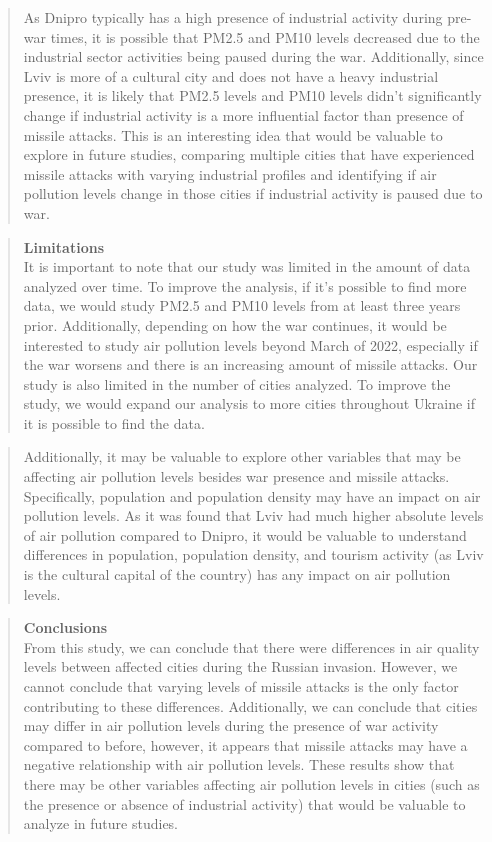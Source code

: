 \documentclass[
  12pt,
]{article}
\begin{document}
\begin{quote}
As Dnipro typically has a high presence of industrial activity during
pre-war times, it is possible that PM2.5 and PM10 levels decreased due
to the industrial sector activities being paused during the war.
Additionally, since Lviv is more of a cultural city and does not have a
heavy industrial presence, it is likely that PM2.5 levels and PM10
levels didn't significantly change if industrial activity is a more
influential factor than presence of missile attacks. This is an
interesting idea that would be valuable to explore in future studies,
comparing multiple cities that have experienced missile attacks with
varying industrial profiles and identifying if air pollution levels
change in those cities if industrial activity is paused due to war.
\end{quote}

\begin{quote}
\textbf{Limitations}\\
It is important to note that our study was limited in the amount of data
analyzed over time. To improve the analysis, if it's possible to find
more data, we would study PM2.5 and PM10 levels from at least three
years prior. Additionally, depending on how the war continues, it would
be interested to study air pollution levels beyond March of 2022,
especially if the war worsens and there is an increasing amount of
missile attacks. Our study is also limited in the number of cities
analyzed. To improve the study, we would expand our analysis to more
cities throughout Ukraine if it is possible to find the data.
\end{quote}

\begin{quote}
Additionally, it may be valuable to explore other variables that may be
affecting air pollution levels besides war presence and missile attacks.
Specifically, population and population density may have an impact on
air pollution levels. As it was found that Lviv had much higher absolute
levels of air pollution compared to Dnipro, it would be valuable to
understand differences in population, population density, and tourism
activity (as Lviv is the cultural capital of the country) has any impact
on air pollution levels.
\end{quote}

\begin{quote}
\textbf{Conclusions}\\
From this study, we can conclude that there were differences in air
quality levels between affected cities during the Russian invasion.
However, we cannot conclude that varying levels of missile attacks is
the only factor contributing to these differences. Additionally, we can
conclude that cities may differ in air pollution levels during the
presence of war activity compared to before, however, it appears that
missile attacks may have a negative relationship with air pollution
levels. These results show that there may be other variables affecting
air pollution levels in cities (such as the presence or absence of
industrial activity) that would be valuable to analyze in future
studies.
\end{quote}
\end{document}
